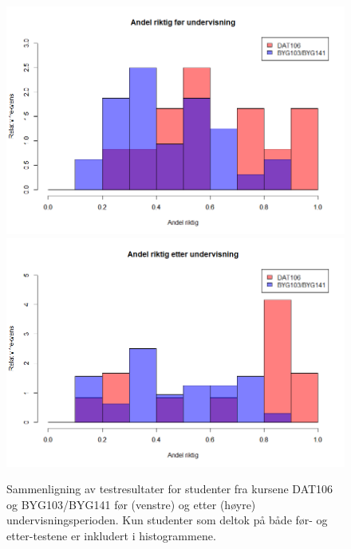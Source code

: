 \documentclass[a4paper,norsk,12pt]{article}
\begin{document}
\begin{figure}[p]
	\includegraphics[width=.48\textwidth]{./preScore}
	\includegraphics[width=.48\textwidth]{./postScore}
	\caption{Sammenligning av testresultater for studenter fra kursene DAT106 og  BYG103/BYG141 før (venstre) og etter (høyre) undervisningsperioden. Kun studenter som deltok på både før- og etter-testene er inkludert i histogrammene.}
	\label{fig:testScoreMatch}
\end{figure}
\end{document}
